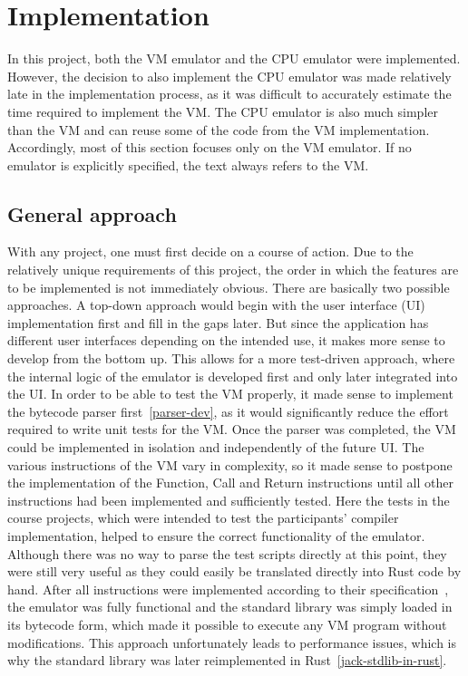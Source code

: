 \section{Implementation} \label{implementation}
In this project, both the VM emulator and the CPU emulator were implemented.
However, the decision to also implement the CPU emulator was made relatively late in the implementation process, as it was difficult to accurately estimate the time required to implement the VM.
The CPU emulator is also much simpler than the VM and can reuse some of the code from the VM implementation.
Accordingly, most of this section focuses only on the VM emulator.
If no emulator is explicitly specified, the text always refers to the VM.

\subsection{General approach}
With any project, one must first decide on a course of action.
Due to the relatively unique requirements of this project, the order in which the features are to be implemented is not immediately obvious.
There are basically two possible approaches.
A top-down approach would begin with the user interface (UI) implementation first and fill in the gaps later.
But since the application has different user interfaces depending on the intended use, it makes more sense to develop from the bottom up.
This allows for a more test-driven approach, where the internal logic of the emulator is developed first and only later integrated into the UI.
In order to be able to test the VM properly, it made sense to implement the bytecode parser first~\ref{parser-dev}, as it would significantly reduce the effort required to write unit tests for the VM.
Once the parser was completed, the VM could be implemented in isolation and independently of the future UI.
The various instructions of the VM vary in complexity, so it made sense to postpone the implementation of the Function, Call and Return instructions until all other instructions had been implemented and sufficiently tested.
Here the tests in the course projects, which were intended to test the participants' compiler implementation, helped to ensure the correct functionality of the emulator.
Although there was no way to parse the test scripts directly at this point, they were still very useful as they could easily be translated directly into Rust code by hand.
After all instructions were implemented according to their specification~\cite{nisan2005}, the emulator was fully functional and the standard library was simply loaded in its bytecode form, which made it possible to execute any VM program without modifications.
This approach unfortunately leads to performance issues, which is why the standard library was later reimplemented in Rust~\ref{jack-stdlib-in-rust}.

